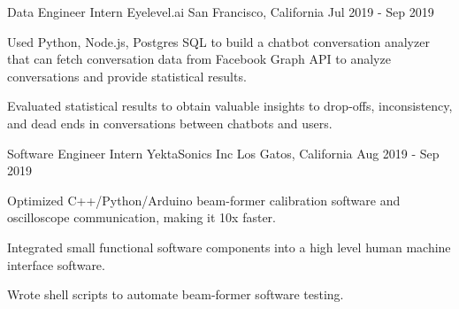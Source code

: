 

\begin{cventries}

  \cventry
    {Data Engineer Intern} %
    {Eyelevel.ai} %
    {San Francisco, California} %
    {Jul 2019 - Sep 2019} %
    {
	\begin{cvitems} %
      	\item Used Python, Node.js, Postgres SQL to build a chatbot conversation analyzer that can fetch conversation data from Facebook Graph API to analyze conversations and provide statistical results.
      	\item Evaluated statistical results to obtain valuable insights to drop-offs, inconsistency, and dead ends in conversations between chatbots and users.
	\end{cvitems}
    }
    
  \cventry
    {Software Engineer Intern} %
    {YektaSonics Inc} %
    {Los Gatos, California} %
    {Aug 2019 - Sep 2019} %
    {
	\begin{cvitems} %
      	\item Optimized C++/Python/Arduino beam-former calibration software and oscilloscope communication, making it 10x faster.
      	\item Integrated small functional software components into a high level human machine interface software. 
      	\item Wrote shell scripts to automate beam-former software testing.
	\end{cvitems}
    }
    

\end{cventries}
